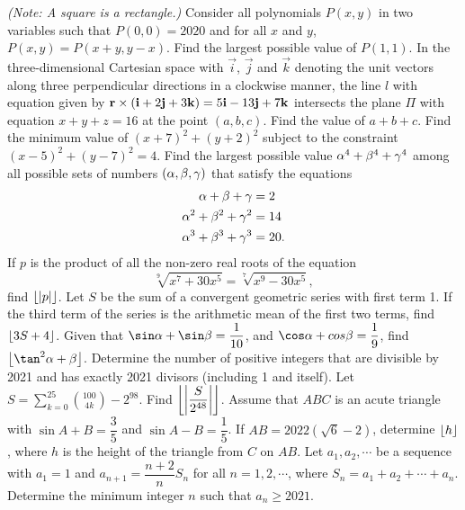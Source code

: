 \begin{enumerate}
    \textit{(Note: A square is a rectangle.)}
    \hyperrefitem[Q::2021-O-1-6] Consider all polynomials $P(x, y)$ in two variables such that $P(0, 0) = 2020$ and for all $x$ and $y$, $P(x, y) = P(x + y, y - x)$. Find the largest possible value of $P(1, 1)$.
    \hyperrefitem[Q::2021-O-1-7] In the three-dimensional Cartesian space with $\vec i$, $\vec j$ and $\vec k$ denoting the unit vectors along three perpendicular directions in a clockwise manner, the line $l$ with equation given by $\mathbf{r} \times (\mathbf{i} + 2 \mathbf{j} + 3 \mathbf{k}) = 5\mathbf{i} - 13\mathbf{j} + 7\mathbf{k}$ intersects the plane $\Pi$ with equation $x + y + z = 16$ at the point $(a, b, c)$. Find the value of $a + b + c$.
    \hyperrefitem[Q::2021-O-1-8] Find the minimum value of $(x + 7)^2 + (y + 2)^2$ subject to the constraint $(x-5)^2 + (y-7)^2 = 4$.
    \hyperrefitem[Q::2021-O-1-9] Find the largest possible value $\alpha^4 + \beta^4 + \gamma^4$ among all possible sets of numbers $(\alpha, \beta, \gamma)$ that satisfy the equations
    \[\begin{aligned}
        \alpha + \beta + \gamma &= 2\\
        \alpha^2 + \beta^2 + \gamma^2 &= 14\\
        \alpha^3 + \beta^3 + \gamma^3 &= 20.
    \end{aligned}\]
    \hyperrefitem[Q::2021-O-1-10] If $p$ is the product of all the non-zero real roots of the equation \[\sqrt[9]{x^7 + 30x^5} = \sqrt[7]{x^9 - 30x^5},\] find $\left\lfloor \left\lvert p \right\rvert \right\rfloor$.
    \hyperrefitem[Q::2021-O-1-11] Let $S$ be the sum of a convergent geometric series with first term 1. If the third term of the series is the arithmetic mean of the first two terms, find $\left\lfloor 3S + 4 \right\rfloor$.
    \hyperrefitem[Q::2021-O-1-12] Given that $\sin \a + \sin \b = \dfrac1{10}$, and $\cos \a + cos \b = \dfrac19$, find $\floor{\tan^2{\a + \b}}$.
    \hyperrefitem[Q::2021-O-1-13] Determine the number of positive integers that are divisible by 2021 and has exactly 2021 divisors (including 1 and itself).
    \hyperrefitem[Q::2021-O-1-14] Let $S = \displaystyle\sum_{k=0}^{25} \binom{100}{4k} - 2^{98}$. Find $\left\lfloor \left\lvert \dfrac{S}{2^{48}} \right\rvert \right\rfloor$.
    \hyperrefitem[Q::2021-O-1-15] Assume that $ABC$ is an acute triangle with $\sin{A + B} = \dfrac35$ and $\sin{A-B} = \dfrac15$. If $AB = 2022(\sqrt6 - 2)$, determine $\left\lfloor h \right\rfloor$, where $h$ is the height of the triangle from $C$ on $AB$.
    \hyperrefitem[Q::2021-O-1-16] Let $a_1, a_2, \cdots$ be a sequence with $a_1 = 1$ and $a_{n+1} = \dfrac{n+2}{n} S_n$ for all $n = 1, 2, \cdots$, where $S_n = a_1 + a_2 + \cdots + a_n$. Determine the minimum integer $n$ such that $a_n \geq 2021$.

\end{enumerate}
